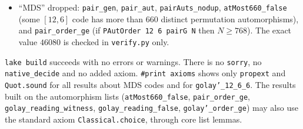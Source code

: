 \documentclass[11pt]{article}
\theoremstyle{remark}
\begin{document}
\begin{itemize}
products $h\circ k$ are distinct permutation automorphisms.
\texttt{golay\_reading\_witness} gives a $[12,6,6]$ code with more than $660$
distinct permutation automorphisms, and \texttt{golay\_reading\_false} gives
$\neg$\texttt{GolayMax660} (``no $[12,6,6]$ ternary code has more than $660$
permutation automorphisms''). \texttt{golay'\_order\_ge} shows that any
\texttt{PAutOrder} of \texttt{golay'} is at least $720$. The exact orders
$660$ and $7920$ and the five-class spectrum are computed in \texttt{verify.py}
only.
\item ``MDS'' dropped: \texttt{pair\_gen}, \texttt{pair\_aut},
\texttt{pairAuts\_nodup}, \texttt{atMost660\_false} (some $[12,6]$ code has
more than $660$ distinct permutation automorphisms), and
\texttt{pair\_order\_ge} (if \texttt{PAutOrder 12 6 pairG N} then
$N\ge768$). The exact value $46080$ is checked in \texttt{verify.py}
only.
\end{itemize}
\texttt{lake build} succeeds with no errors or warnings. There is no
\texttt{sorry}, no \texttt{native\_decide} and no added axiom.
\texttt{\#print axioms} shows only \texttt{propext} and \texttt{Quot.sound} for
all results about MDS codes and for \texttt{golay'\_12\_6\_6}. The results
built on the automorphism lists (\texttt{atMost660\_false},
\texttt{pair\_order\_ge}, \texttt{golay\_reading\_witness},
\texttt{golay\_reading\_false}, \texttt{golay'\_order\_ge}) may also use the
standard axiom \texttt{Classical.choice}, through core list lemmas.
\end{document}
